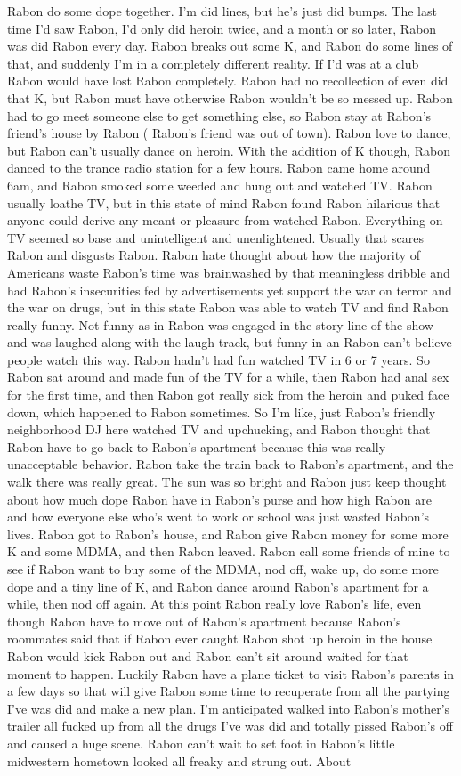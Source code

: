 \documentclass[12pt]{book}
\begin{document}
Rabon do some dope together. I'm did lines, but he's just did bumps. The last time I'd saw Rabon, I'd only did heroin twice, and a month or so later, Rabon was did Rabon every day. Rabon breaks out some K, and Rabon do some lines of that, and suddenly I'm in a completely different reality. If I'd was at a club Rabon would have lost Rabon completely. Rabon had no recollection of even did that K, but Rabon must have otherwise Rabon wouldn't be so messed up. Rabon had to go meet someone else to get something else, so Rabon stay at Rabon's friend's house by Rabon ( Rabon's friend was out of town). Rabon love to dance, but Rabon can't usually dance on heroin. With the addition of K though, Rabon danced to the trance radio station for a few hours. Rabon came home around 6am, and Rabon smoked some weeded and hung out and watched TV. Rabon usually loathe TV, but in this state of mind Rabon found Rabon hilarious that anyone could derive any meant or pleasure from watched Rabon. Everything on TV seemed so base and unintelligent and unenlightened. Usually that scares Rabon and disgusts Rabon. Rabon hate thought about how the majority of Americans waste Rabon's time was brainwashed by that meaningless dribble and had Rabon's insecurities fed by advertisements yet support the war on terror and the war on drugs, but in this state Rabon was able to watch TV and find Rabon really funny. Not funny as in Rabon was engaged in the story line of the show and was laughed along with the laugh track, but funny in an Rabon can't believe people watch this way. Rabon hadn't had fun watched TV in 6 or 7 years. So Rabon sat around and made fun of the TV for a while, then Rabon had anal sex for the first time, and then Rabon got really sick from the heroin and puked face down, which happened to Rabon sometimes. So I'm like, just Rabon's friendly neighborhood DJ here watched TV and upchucking, and Rabon thought that Rabon have to go back to Rabon's apartment because this was really unacceptable behavior. Rabon take the train back to Rabon's apartment, and the walk there was really great. The sun was so bright and Rabon just keep thought about how much dope Rabon have in Rabon's purse and how high Rabon are and how everyone else who's went to work or school was just wasted Rabon's lives. Rabon got to Rabon's house, and Rabon give Rabon money for some more K and some MDMA, and then Rabon leaved. Rabon call some friends of mine to see if Rabon want to buy some of the MDMA, nod off, wake up, do some more dope and a tiny line of K, and Rabon dance around Rabon's apartment for a while, then nod off again. At this point Rabon really love Rabon's life, even though Rabon have to move out of Rabon's apartment because Rabon's roommates said that if Rabon ever caught Rabon shot up heroin in the house Rabon would kick Rabon out and Rabon can't sit around waited for that moment to happen. Luckily Rabon have a plane ticket to visit Rabon's parents in a few days so that will give Rabon some time to recuperate from all the partying I've was did and make a new plan. I'm anticipated walked into Rabon's mother's trailer all fucked up from all the drugs I've was did and totally pissed Rabon's off and caused a huge scene. Rabon can't wait to set foot in Rabon's little midwestern hometown looked all freaky and strung out. About 
\end{document}
